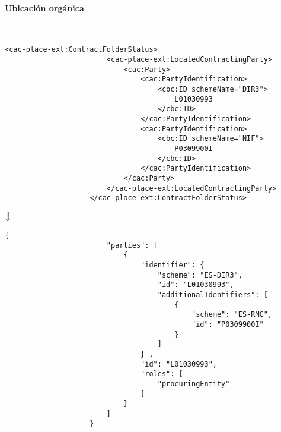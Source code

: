             \paragraph{Ubicación orgánica} \mbox{}\\
                \begin{lstlisting}[language=lXML]
                    <cac-place-ext:ContractFolderStatus>
                        <cac-place-ext:LocatedContractingParty>
                            <cac:Party>
                                <cac:PartyIdentification>
                                    <cbc:ID schemeName="DIR3">
                                        L01030993
                                    </cbc:ID>
                                </cac:PartyIdentification>
                                <cac:PartyIdentification>
                                    <cbc:ID schemeName="NIF">
                                        P0309900I
                                    </cbc:ID>
                                </cac:PartyIdentification>
                            </cac:Party>
                        </cac-place-ext:LocatedContractingParty>
                    </cac-place-ext:ContractFolderStatus>
                \end{lstlisting}
                
                \begin{center}
                    $\big\Downarrow$
                \end{center}
                
                \begin{lstlisting}[language=lJSON]
                    {
                        "parties": [
                            {
                                "identifier": {
                                    "scheme": "ES-DIR3",
                                    "id": "L01030993",
                                    "additionalIdentifiers": [
                                        {
                                            "scheme": "ES-RMC",
                                            "id": "P0309900I"
                                        }
                                    ]
                                } ,
                                "id": "L01030993",
                                "roles": [
                                    "procuringEntity"
                                ]
                            }
                        ]
                    }
                \end{lstlisting}
\newpage
